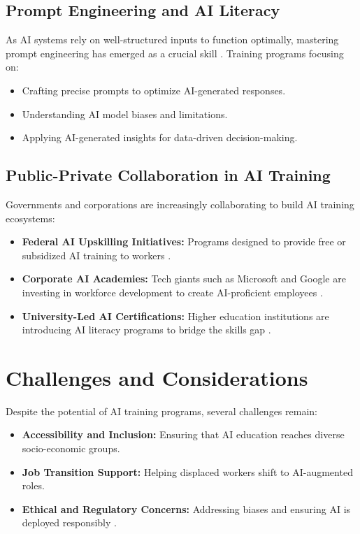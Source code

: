 \documentclass[a4paper,headinclude=on,footinclude=on,12pt,oneside]{scrbook}
\begin{document}
\subsection{Prompt Engineering and AI Literacy}

As AI systems rely on well-structured inputs to function optimally, mastering prompt engineering has emerged as a crucial skill \cite{EffectiveAIPrompting, PromptingAIChatbots}. Training programs focusing on:
\begin{itemize}
	\item Crafting precise prompts to optimize AI-generated responses.
	\item Understanding AI model biases and limitations.
	\item Applying AI-generated insights for data-driven decision-making.
\end{itemize}

\subsection{Public-Private Collaboration in AI Training}

Governments and corporations are increasingly collaborating to build AI training ecosystems:
\begin{itemize}
	\item \textbf{Federal AI Upskilling Initiatives:} Programs designed to provide free or subsidized AI training to workers \cite{InstructionalDesignDelivery}.
	\item \textbf{Corporate AI Academies:} Tech giants such as Microsoft and Google are investing in workforce development to create AI-proficient employees \cite{MicrosoftCopilotAI}.
	\item \textbf{University-Led AI Certifications:} Higher education institutions are introducing AI literacy programs to bridge the skills gap \cite{chriscarmichaelLibraryGuidesGuideArtificial}.
\end{itemize}

\section{Challenges and Considerations}

Despite the potential of AI training programs, several challenges remain:
\begin{itemize}
	\item \textbf{Accessibility and Inclusion:} Ensuring that AI education reaches diverse socio-economic groups.
	\item \textbf{Job Transition Support:} Helping displaced workers shift to AI-augmented roles.
	\item \textbf{Ethical and Regulatory Concerns:} Addressing biases and ensuring AI is deployed responsibly \cite{StudentPGRGuidance}.
\end{itemize}
\end{document}
